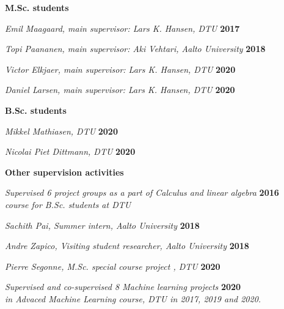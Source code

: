 \documentclass[10pt]{article}
\newcommand{\halfblankline}{\quad\vspace{-0.5\baselineskip}\pagebreak[3]}
\begin{document}
\textbf{M.Sc. students}
\begin{outerlist}

\item \textit{Emil Maagaard, main supervisor: Lars K. Hansen, DTU}%
            \hfill \textbf{2017}

\item \textit{Topi Paananen, main supervisor: Aki Vehtari, Aalto University}%
            \hfill \textbf{2018}

\item \textit{Victor Elkjaer, main supervisor: Lars K. Hansen, DTU}%
            \hfill \textbf{2020}

\item \textit{Daniel Larsen, main supervisor: Lars K. Hansen, DTU}%
            \hfill \textbf{2020}

\end{outerlist}
\halfblankline

\textbf{B.Sc. students}
\begin{outerlist}
\item \textit{Mikkel Mathiasen, DTU}%
            \hfill \textbf{2020}

\item \textit{Nicolai Piet Dittmann, DTU}%
            \hfill \textbf{2020}
\end{outerlist}
\halfblankline

\textbf{Other supervision activities}
\begin{outerlist}
\item \textit{Supervised 6 project groups as a part of Calculus and linear algebra}%
            \hfill \textbf{2016}\\
             \textit{course for B.Sc. students at DTU}
        

\item \textit{Sachith Pai, Summer intern, Aalto University}%
            \hfill \textbf{2018}

\item \textit{Andre Zapico, Visiting student researcher, Aalto University}%
            \hfill \textbf{2018}

\item \textit{Pierre Segonne, M.Sc. special course project , DTU}%
            \hfill \textbf{2020}

\item \textit{Supervised and co-supervised 8 Machine learning projects}%
            \hfill \textbf{2020}\\
            \textit{in Advaced Machine Learning course, DTU in 2017, 2019 and 2020.}
            


\end{outerlist}
\end{document}

